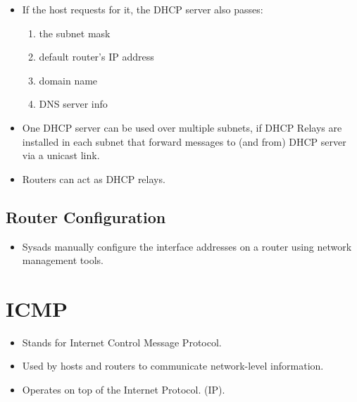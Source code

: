 \documentclass{report}
\begin{document}
\begin{itemize}
\item If the host requests for it, the DHCP server also passes:
\label{addinfo}
\begin{enumerate}
    \item the subnet mask
    \item default router's IP address
    \item domain name
    \item DNS server info
\end{enumerate}
\item One DHCP server can be used over multiple subnets, if DHCP Relays are installed in each subnet that forward messages to (and from) DHCP server via a unicast link.
\item Routers can act as DHCP relays.
\end{itemize}
\subsection{Router Configuration}
\begin{itemize}
\item Sysads manually configure the interface addresses on a router using network management tools.
\end{itemize}

\section{ICMP}
\label{sec:icmp}
\begin{itemize}
\item Stands for Internet Control Message Protocol.
\item Used by hosts and routers to communicate network-level information.
\item Operates on top of the Internet Protocol. (IP).
\end{itemize}
\end{document}
